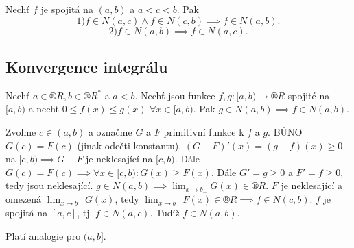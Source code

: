 \documentclass[12pt]{article}                   %
\begin{document}
        \begin{pozorovani}
            Nechť $f$ je spojitá na $(a, b)$ a $a < c < b$. Pak
            $$ 1) f \in N(a, c) \land f \in N(c, b) \implies f \in N(a, b). $$ 
            $$ 2) f \in N(a, b) \implies f \in N(a, c). $$ 
        \end{pozorovani}


    \subsection{Konvergence integrálu}
        \begin{veta}
            Nechť $a \in ®R, b \in ®R^*$ a $a < b$. Nechť jsou funkce $f, g: [a, b) \rightarrow ®R$ spojité na $[a, b)$ a nechť $0 ≤ f(x) ≤ g(x)$ $\forall x \in [a, b)$. Pak $g \in N(a, b) \implies f \in N(a, b)$.

            \begin{dukazin}
                Zvolme $c \in (a, b)$ a označme $G$ a $F$ primitivní funkce k $f$ a $g$. BÚNO $G(c) = F(c)$ (jinak odečti konstantu). $(G-F)'(x) = (g - f)(x) ≥ 0$ na $[c, b) \implies G-F$ je neklesající na $[c, b)$. Dále $G(c) = F(c) \implies \forall x \in [c, b): G(x) ≥ F(x)$. Dále $G'=g≥0$ a $F'=f≥0$, tedy jsou neklesající. $g \in N(a, b) \implies \lim_{x \rightarrow b_-} G(x) \in ®R$. $F$ je neklesající a omezená $\lim_{x \rightarrow b_-} G(x)$, tedy $\lim_{x \rightarrow b_-} F(x) \in ®R \implies f\in N(c, b)$. $f$ je spojitá na $[a,c]$, tj. $f \in N(a, c)$. Tudíž $f \in N(a, b)$.
            \end{dukazin}
        \end{veta}

        \begin{poznamka}
            Platí analogie pro $(a, b]$.
        \end{poznamka}
\end{document}
